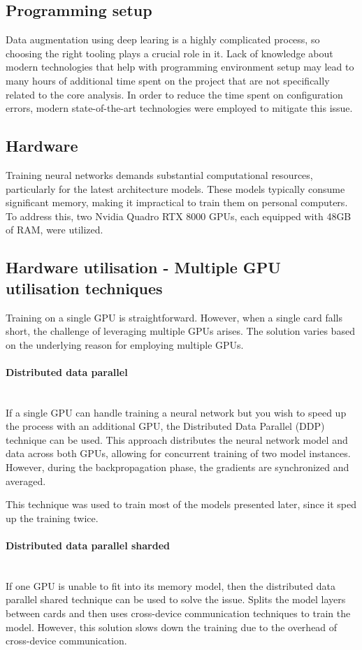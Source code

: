 \subsection{Programming setup}
Data augmentation using deep learing is a highly complicated process, so choosing the right tooling plays a crucial role in it. Lack of knowledge about modern technologies that help with programming environment setup may lead to many hours of additional time spent on the project that are not specifically related to the core analysis. In order to reduce the time spent on configuration errors, modern state-of-the-art technologies were employed to mitigate this issue.  


\newpage
\subsection{Hardware}
Training neural networks demands substantial computational resources, particularly for the latest architecture models. These models typically consume significant memory, making it impractical to train them on personal computers. To address this, two Nvidia Quadro RTX 8000 GPUs, each equipped with 48GB of RAM, were utilized. 

\subsection{Hardware utilisation - Multiple GPU utilisation techniques}
Training on a single GPU is straightforward. However, when a single card falls short, the challenge of leveraging multiple GPUs arises. The solution varies based on the underlying reason for employing multiple GPUs.
\paragraph{Distributed data parallel}\mbox{} \\
If a single GPU can handle training a neural network but you wish to speed up the process with an additional GPU, the Distributed Data Parallel (DDP) technique can be used. This approach distributes the neural network model and data across both GPUs, allowing for concurrent training of two model instances. However, during the backpropagation phase, the gradients are synchronized and averaged.

This technique was used to train most of the models presented later, since it sped up the training twice. 

\paragraph{Distributed data parallel sharded}\mbox{} \\
If one GPU is unable to fit into its memory model, then the distributed data parallel shared technique can be used to solve the issue. Splits the model layers between cards and then uses cross-device communication techniques to train the model. However, this solution slows down the training due to the overhead of cross-device communication.

